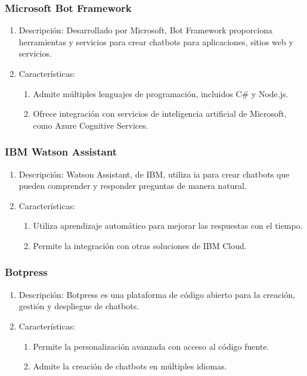 \subsubsection{Microsoft Bot Framework}
\begin{enumerate}
\item Descripción: Desarrollado por Microsoft, Bot Framework proporciona herramientas y servicios para crear chatbots para aplicaciones, sitios web y servicios.
\item Características:
\begin{enumerate}
\item Admite múltiples lenguajes de programación, incluidos C\# y Node.js.
\item Ofrece integración con servicios de inteligencia artificial de Microsoft, como Azure Cognitive Services.
\end{enumerate}
\end{enumerate}

\subsubsection{IBM Watson Assistant}
\begin{enumerate}
\item Descripción: Watson Assistant, de IBM, utiliza \acrshort{ia} para crear chatbots que pueden comprender y responder preguntas de manera natural.
\item Características:
\begin{enumerate}
\item Utiliza aprendizaje automático para mejorar las respuestas con el tiempo.
\item Permite la integración con otras soluciones de IBM Cloud.
\end{enumerate}
\end{enumerate}

\subsubsection{Botpress}
\begin{enumerate}
\item Descripción: Botpress es una plataforma de código abierto para la creación, gestión y despliegue de chatbots.
\item Características:
\begin{enumerate}
\item Permite la personalización avanzada con acceso al código fuente.
\item Admite la creación de chatbots en múltiples idiomas.
\end{enumerate}
\end{enumerate}

